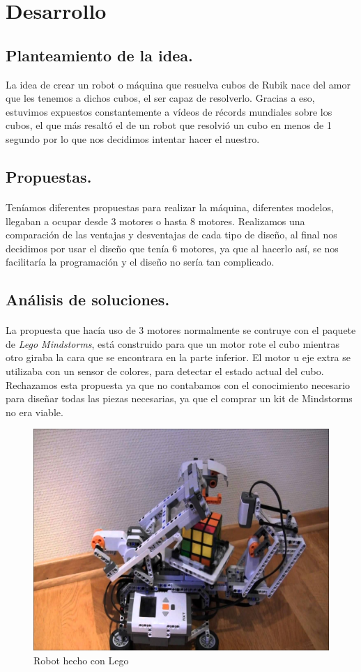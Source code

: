 \documentclass[12pt, letterpaper]{article}
\begin{document}
\section{Desarrollo}
\subsection{Planteamiento de la idea.}
La idea de crear un robot o máquina que resuelva cubos de Rubik nace del amor que les tenemos a dichos cubos, el ser capaz de resolverlo. Gracias a eso, estuvimos expuestos constantemente a vídeos de récords mundiales sobre los cubos, el que más resaltó el de un robot que resolvió un cubo en menos de 1 segundo por lo que nos decidimos intentar hacer el nuestro.
\subsection{Propuestas.}
\paragraph{}
Teníamos diferentes propuestas para realizar la máquina, diferentes modelos, llegaban a ocupar desde 3 motores o hasta 8 motores. Realizamos una comparación de las ventajas y desventajas de cada tipo de diseño, al final nos decidimos por usar el diseño que tenía 6 motores, ya que al hacerlo así, se nos facilitaría la programación y el diseño no sería tan complicado.
\subsection{Análisis de soluciones.}
\paragraph{}
La propuesta que hacía uso de 3 motores normalmente se contruye con el paquete de \emph{Lego Mindstorms}, está construido para que un motor rote el cubo mientras otro giraba la cara que se encontrara en la parte inferior. El motor u eje extra se utilizaba con un sensor de colores, para detectar el estado actual del cubo. Rechazamos esta propuesta ya que no contabamos con el conocimiento necesario para diseñar todas las piezas necesarias, ya que el comprar un kit de Mindstorms no era viable.
\begin{figure}[!hb]
	\centering
	\includegraphics[width=0.3\linewidth]{images/prop1.jpg}
	\caption{Robot hecho con Lego} \label{fig:prop1}
\end{figure}
\end{document}
